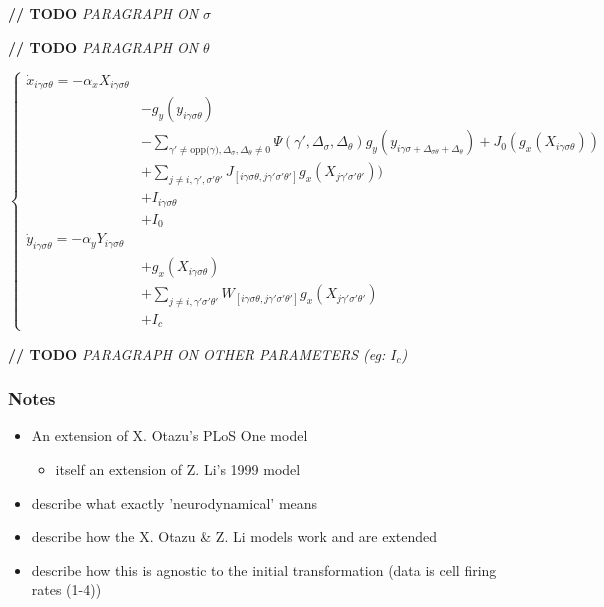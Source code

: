 \documentclass[journal,onecolumn]{IEEEtran}
\begin{document}
\textbf{// TODO} \textit{PARAGRAPH ON $\sigma$}

\textbf{// TODO} \textit{PARAGRAPH ON $\theta$}

\begin{equation}
\begin{cases} 
\dot{x}_{i\gamma\sigma\theta} = - \alpha_{x}X_{i\gamma\sigma\theta} \\
    & - g_y(y_{i\gamma\sigma\theta}) \\
    & - \sum\nolimits_{\gamma' \neq \text{opp($\gamma$)},\Delta_{\sigma},\Delta_{\theta} \neq 0}
        \Psi(\gamma',\Delta_{\sigma},\Delta_{\theta})
        g_y(y_{i\gamma\sigma + \Delta_{\sigma\theta} + \Delta_{\theta}})
        + J_0(g_x(X_{i\gamma\sigma\theta})) \\
    & + \sum\nolimits_{j \neq i,\gamma',\sigma'\theta'}
        J_{[i\gamma\sigma\theta, j\gamma'\sigma'\theta']}g_x(X_{j\gamma'\sigma'\theta'})) \\
    & + I_{i\gamma\sigma\theta} \\
    & + I_0 \\
\dot{y}_{i\gamma\sigma\theta} = - \alpha_{y}Y_{i\gamma\sigma\theta} \\
    & + g_x(X_{i\gamma\sigma\theta}) \\
    & + \sum\nolimits_{j \neq i, \gamma'\sigma'\theta'}
        W_{[i\gamma\sigma\theta, j\gamma'\sigma'\theta']}g_x(X_{j\gamma'\sigma'\theta'}) \\
    & + I_{c}
\end{cases}
\end{equation}

\textbf{// TODO} \textit{PARAGRAPH ON OTHER PARAMETERS (eg: $I_{c}$)}

\subsubsection{Notes}
\begin{itemize}
    \item An extension of X. Otazu's PLoS One model
    \begin{itemize}
        \item itself an extension of Z. Li's 1999 model
    \end{itemize}
    \item describe what exactly 'neurodynamical' means
    \item describe how the X. Otazu \& Z. Li models work and are extended
    \item describe how this is agnostic to the initial transformation (data is cell firing rates (1-4))
\end{itemize}
\end{document}
